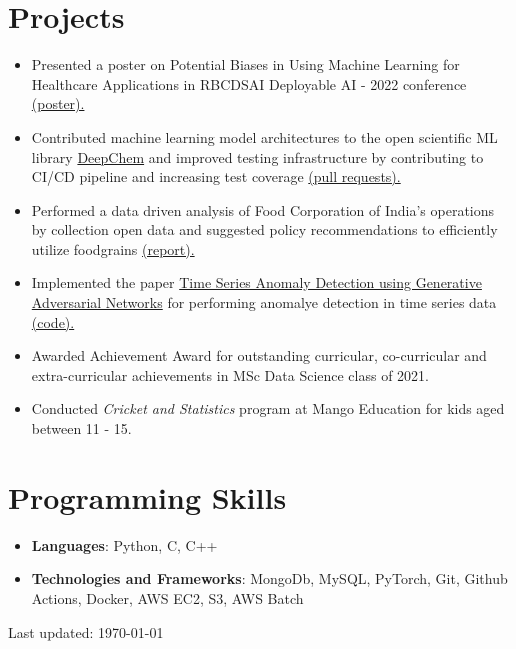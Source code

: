 \documentclass[letterpaper,11pt]{article}
\newcommand{\resumeItemSimple}[1]{
  \item\small{
    {#1 \vspace{-2pt}}
  }
}
\newcommand{\resumeSubItemSimple}[1]{\resumeItemSimple{#1}\vspace{-4pt}}
\newcommand{\resumeSubHeadingListStart}{\begin{itemize}[leftmargin=*]}
\newcommand{\resumeSubHeadingListEnd}{\end{itemize}}
\begin{document}
\section{Projects}
  \resumeSubHeadingListStart
    \resumeSubItemSimple {Presented a poster on Potential Biases in Using Machine Learning for Healthcare Applications in RBCDSAI Deployable AI - 2022 conference \href{https://www.arunppsg.in/assets/files/healthcare_bias.pdf}{(poster).}}
    \resumeSubItemSimple {Contributed machine learning model architectures to the open scientific ML library \href{https://deepchem.io/}{DeepChem} and improved testing infrastructure by contributing to CI/CD pipeline and increasing test coverage {\href{https://github.com/deepchem/deepchem/pulls?q=is\%3Apr+author\%3Aarunppsg+is\%3Aclosed}{(pull requests).}}}
    \resumeSubItemSimple {Performed a data driven analysis of Food Corporation of India's operations by collection open data and suggested policy recommendations to efficiently utilize foodgrains \href{https://www.arunppsg.in/assets/files/FCI.pdf}{(report).}}
    \resumeSubItemSimple {Implemented the paper \href{https://arxiv.org/abs/2009.07769}{Time Series Anomaly Detection using Generative Adversarial Networks} for performing anomalye detection in time series data \href{https://github.com/arunppsg/tadGAN}{(code).}}
    \resumeSubItemSimple {Awarded Achievement Award for outstanding curricular, co-curricular and extra-curricular achievements in MSc Data Science class of 2021.}
    \resumeSubItemSimple {Conducted \textit{Cricket and Statistics} program at Mango Education for kids aged between 11 - 15.}
  \resumeSubHeadingListEnd
%
\section{Programming Skills}
  \resumeSubHeadingListStart
    \resumeSubItemSimple{\textbf{Languages}{: Python, C, C++}}
    \resumeSubItemSimple{\textbf{Technologies and Frameworks}{: MongoDb, MySQL, PyTorch, Git, Github Actions, Docker, AWS EC2, S3, AWS Batch}}
  \resumeSubHeadingListEnd


\begin{footnotesize}
  Last updated: \today
\end{footnotesize}
\end{document}

